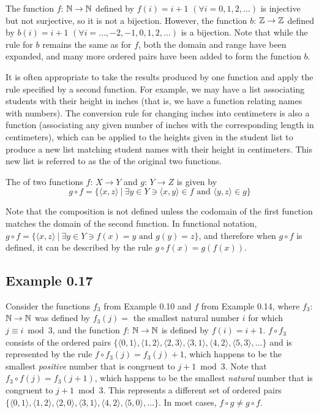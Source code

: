 The function $f$: $\mathbb{N} \rightarrow \mathbb{N}$ defined by $f(i)=i+1$ $(\forall i=0,1,2,
\ldots)$ is injective but not surjective, so it is not a bijection. However, the
function $b$: $\mathbb{Z}\rightarrow\mathbb{Z}$ defined by $b(i)=i+1$ $(\forall i=\ldots,-2,
-1,0,1,2,\ldots)$ is a bijection. Note that while the rule for $b$ remains the
same as for $f$, both the domain and range have been expanded, and many more
ordered pairs have been added to form the function $b$.

It is often appropriate to take the results produced by one function and apply
the rule specified by a second function. For example, we may have a list
associating students with their height in inches (that is, we have a function
relating names with numbers). The conversion rule for changing inches into
centimeters is also a function (associating any given number of inches with the
corresponding length in centimeters), which can be applied to the heights given
in the student list to produce a new list matching student names with their
height in centimeters. This new list is referred to as the
\emph{} of the original two functions.

\begin{dfn}\label{dfn-0.17}
The \emph{} of two functions $f$: $X\rightarrow Y$ and
$g$: $Y\rightarrow Z$ is given by
\[g \circ f = \{\langle x,z\rangle \ |\  \exists y \in Y \ni
	\langle x,y\rangle \in f\text{ and }\langle y,z\rangle \in g\}\]
\end{dfn}

Note that the composition is not defined unless the codomain of the first
function matches the domain of the second function. In functional notation,
$g\circ f=\{\langle x,z\rangle\ |\ \exists y\in Y\ni f(x)=y\text{ and }g(y)=z\}$,
and therefore when $g\circ f$ is defined, it can be described by the rule
$g\circ f(x)=g(f(x))$.

\subsection*{Example 0.17}

Consider the functions $f_3$ from Example 0.10 and $f$ from Example 0.14, where
$f_3$: $\mathbb{N}\rightarrow\mathbb{N}$ was defined by $f_3(j) =$ the smallest natural number
$i$ for which $j \equiv i \bmod{3}$, and the function $f$: $\mathbb{N}\rightarrow\mathbb{N}$ is
defined by $f(i) = i + 1$. $f \circ f_3$ consists of the ordered pairs
$\{\langle 0,1\rangle,\langle 1,2\rangle,\langle 2,3\rangle,\langle 3,1\rangle,
\langle 4,2\rangle,\langle 5,3\rangle, \ldots \}$ and is represented by the rule
$f\circ f_3(j) = f_3(j) + 1$, which happens to be the smallest \emph{positive}
number that is congruent to $j + 1 \bmod{3}$. Note that
$f_3 \circ f(j) = f_3 (j + 1)$, which happens to be the smallest \emph{natural}
number that is congruent to $j + 1 \bmod{3}$. This represents a different set
of ordered pairs $\{\langle 0,1\rangle,\langle 1,2\rangle,\langle 2,0\rangle,
\langle 3,1\rangle,\langle 4,2\rangle,\langle 5,0\rangle, \ldots \}$. In most
cases, $f \circ g \not= g \circ f$.

